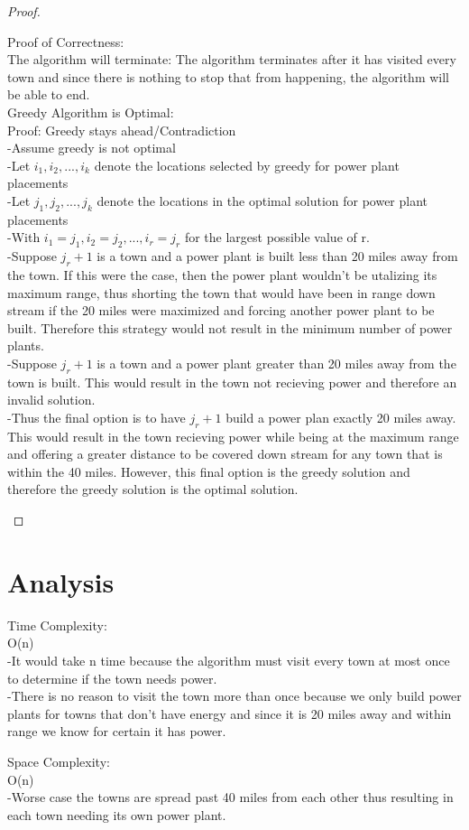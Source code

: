 \documentclass[11pt]{article}
\begin{document}
\begin{proof}
\begin{text}
Proof of Correctness:\\
The algorithm will terminate: The algorithm terminates after it has visited every town and since there is nothing to stop that from happening, the algorithm will be able to end.\\
Greedy Algorithm is Optimal:\\
Proof: Greedy stays ahead/Contradiction \\
-Assume greedy is not optimal\\
-Let $i_1, i_2,..., i_k$ denote the locations selected by greedy for power plant placements\\
-Let $j_1,j_2,..., j_k$ denote the locations in the optimal solution for power plant placements\\
-With $i_1  = j_1, i_2 = j_2, ..., i_r = j _r$ for the largest possible value of r. \\
-Suppose $j_r+1$ is a town and a power plant is built less than 20 miles away from the town. If this were the case, then the power plant wouldn't be utalizing its maximum range, thus shorting the town that would have been in range down stream if the 20 miles were maximized and forcing another power plant to be built. Therefore this strategy would not result in the minimum number of power plants. \\
-Suppose $j_r+1$ is a town and a power plant greater than 20 miles away from the town is built. This would result in the town not recieving power and therefore an invalid solution.\\
-Thus the final option is to have $j_r+1$ build a power plan exactly 20 miles away. This would result in the town recieving power while being at the maximum range and offering a greater distance to be covered down stream for any town that is within the 40 miles. However, this final option is the greedy solution and therefore the greedy solution is the optimal solution.

\end{text}
\end{proof}

\section*{Analysis}

\begin{text}
Time Complexity: \\
O(n)\\
-It would take n time because the algorithm must visit every town at most once to determine if the town needs power.\\
-There is no reason to visit the town more than once because we only build power plants for towns that don't have energy and since it is 20 miles away and within range we know for certain it has power.
\end{text}

\begin{text}
Space Complexity: \\
O(n)\\
-Worse case the towns are spread past 40 miles from each other thus resulting in each town needing its own power plant.
\end{text}
\end{document}

